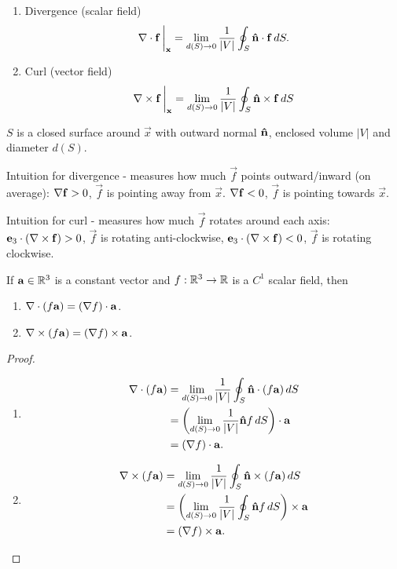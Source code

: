 \documentclass[10pt, a4paper]{article}
\begin{document}
\begin{enumerate}[label = (\roman*)]
    \item Divergence
    (scalar field)
    \[
    \mathbf{\nabla} \cdot \mathbf{f}\,\biggr|_{\mathbf{x}} = \lim_{d(S) \to 0}\frac{1}{|V|}\oint_{S}\mathbf{\hat{n}}\cdot \mathbf{f}\,dS.
    \]

    \item Curl
    (vector field)
    \[
    \mathbf{\nabla} \times \mathbf{f}\,\biggr|_{\mathbf{x}} = \lim_{d(S) \to 0}\frac{1}{|V|}\oint_{S}\mathbf{\hat{n}} \times \mathbf{f}\,dS
    \]
\end{enumerate}
$S$ is a closed surface around $\vec{x}$ with outward normal $\mathbf{\hat{n}}$,
enclosed volume $|V|$ and diameter $d(S)$.

Intuition for divergence -
measures how much $\vec{f}$ points outward/inward
(on average):
$\mathbf{\nabla} \mathbf{f} > 0$,
$\vec{f}$ is pointing away from $\vec{x}$.
$\mathbf{\nabla} \mathbf{f} < 0$,
$\vec{f}$ is pointing towards $\vec{x}$.

Intuition for curl -
measures how much $\vec{f}$ rotates around each axis:
$\mathbf{e}_3 \cdot (\mathbf{\nabla} \times \mathbf{f}) > 0$,
$\vec{f}$ is rotating anti-clockwise,
$\mathbf{e}_3 \cdot (\mathbf{\nabla} \times \mathbf{f}) < 0$,
$\vec{f}$ is rotating clockwise.

\begin{lemma}\label{mathmethII:lem:ctcrssscalareq}
    If $\mathbf{a} \in \mathbb{R} ^ 3$ is a constant vector and $f : \mathbb{R} ^ 3 \to \mathbb{R}$ is a $C ^ {1}$ scalar field,
    then
    \begin{enumerate}[label = (\roman*)]
        \item $\mathbf{\nabla} \cdot (f\mathbf{a}) = (\mathbf{\nabla} f)\cdot \mathbf{a}$.

        \item $\mathbf{\nabla} \times (f\mathbf{a}) = (\mathbf{\nabla} f)\times \mathbf{a}$.
    \end{enumerate}

    \begin{proof}
        \begin{enumerate}[label = (\roman*)]
            \item
            \begin{align*}
                \mathbf{\nabla} \cdot (f\mathbf{a}) &= \lim_{d(S) \to 0}\frac{1}{|V|}\oint_{S}\mathbf{\hat{n}}\cdot(f\mathbf{a})\,dS \\
                &= \left(\lim_{d(S) \to 0}\frac{1}{|V|}\mathbf{\hat{n}}f\,dS\right)\cdot \mathbf{a} \\
                &= (\mathbf{\nabla} f) \cdot\mathbf{a}.
            \end{align*}

            \item
            \begin{align*}
                \mathbf{\nabla} \times (f\mathbf{a}) &= \lim_{d(S) \to 0}\frac{1}{|V|}\oint_{S}\mathbf{\hat{n}}\times (f\mathbf{a})\,dS \\
                &= \left(\lim_{d(S) \to 0}\frac{1}{|V|}\oint_{S}\mathbf{\hat{n}}f\,dS\right) \times \mathbf{a} \\
                &= (\mathbf{\nabla} f)\times\mathbf{a}.
            \end{align*}
        \end{enumerate}
    \end{proof}
\end{lemma}
\end{document}
